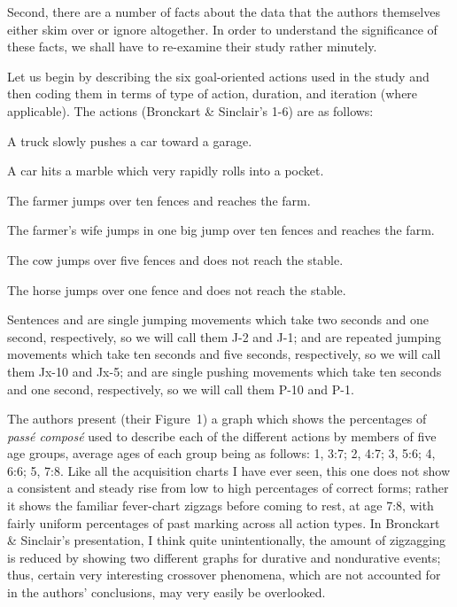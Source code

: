 Second, there are a number of facts about the \citeauthor{BrockartEtAl1973} data that the authors themselves either skim over or ignore altogether. In order to understand the significance of these facts, we shall have to re-examine their study rather minutely.

Let us begin by describing the six goal-oriented actions used in the study and then coding them in terms of type of action, duration, and iteration (where applicable). The actions (Bronckart \& Sinclair's 1-6) are as follows:

\ea\label{ex:3:16}
 A truck slowly pushes a car toward a garage.
\z

\ea\label{ex:3:17}
 A car hits a marble which very rapidly rolls into a pocket.
\z

\ea\label{ex:3:18}
 The farmer jumps over ten fences and reaches the farm.
\z

\ea\label{ex:3:19}
 The farmer's wife jumps in one big jump over ten fences and reaches the farm.
\z

\ea\label{ex:3:20}
 The cow jumps over five fences and does not reach the stable.
\z

\ea\label{ex:3:21}
 The horse jumps over one fence and does not reach the stable.
\z




Sentences  and  are single jumping movements which take two seconds and one second, respectively, so we will call them J-2 and J-1;  and  are repeated jumping movements which take ten seconds and five seconds, respectively, so we will call them Jx-10 and Jx-5;  and  are single pushing movements which take ten seconds and one second, respectively, so we will call them P-10 and P-1.

The authors present (their Figure~1) a graph which shows the percentages of \textit{pass\'e compos\'e} used to describe each of the different actions by members of five age groups, average ages of each group being as follows: 1, 3:7; 2, 4:7; 3, 5:6; 4, 6:6; 5, 7:8. Like all the acquisition charts I have ever seen, this one does not show a consistent and steady rise from low to high percentages of correct forms; rather it shows the familiar fever-chart zigzags before coming to rest, at age 7:8, with fairly uniform percentages of past marking across all action types. In Bronckart \& Sinclair's presentation, I think quite unintentionally, the amount of zigzagging is reduced by showing two different graphs for durative and nondurative events; thus, certain very interesting crossover phenomena, which are not accounted for in the authors' conclusions, may very easily be overlooked.

